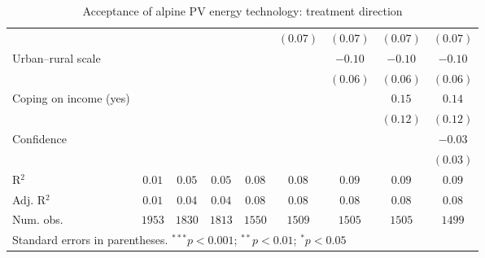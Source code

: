 \begin{table}[h]
\begin{center}
\begin{tabular}{l c c c c c c c c}
                                                                                &              &              &              &               & $(0.07)$      & $(0.07)$      & $(0.07)$      & $(0.07)$      \\
Urban–rural scale                                                               &              &              &              &               &               & $-0.10$       & $-0.10$       & $-0.10$       \\
                                                                                &              &              &              &               &               & $(0.06)$      & $(0.06)$      & $(0.06)$      \\
Coping on income (yes)                                                          &              &              &              &               &               &               & $0.15$        & $0.14$        \\
                                                                                &              &              &              &               &               &               & $(0.12)$      & $(0.12)$      \\
Confidence                                                                      &              &              &              &               &               &               &               & $-0.03$       \\
                                                                                &              &              &              &               &               &               &               & $(0.03)$      \\
\hline
R$^2$                                                                           & $0.01$       & $0.05$       & $0.05$       & $0.08$        & $0.08$        & $0.09$        & $0.09$        & $0.09$        \\
Adj. R$^2$                                                                      & $0.01$       & $0.04$       & $0.04$       & $0.08$        & $0.08$        & $0.08$        & $0.08$        & $0.08$        \\
Num. obs.                                                                       & $1953$       & $1830$       & $1813$       & $1550$        & $1509$        & $1505$        & $1505$        & $1499$        \\
\hline
\multicolumn{9}{l}{\scriptsize{Standard errors in parentheses. $^{***}p<0.001$; $^{**}p<0.01$; $^{*}p<0.05$}}
\end{tabular}
\caption{Acceptance of alpine PV energy technology: treatment direction}
\label{table:acceptance_alpine_pv_treatment_direction}
\end{center}
\end{table}
